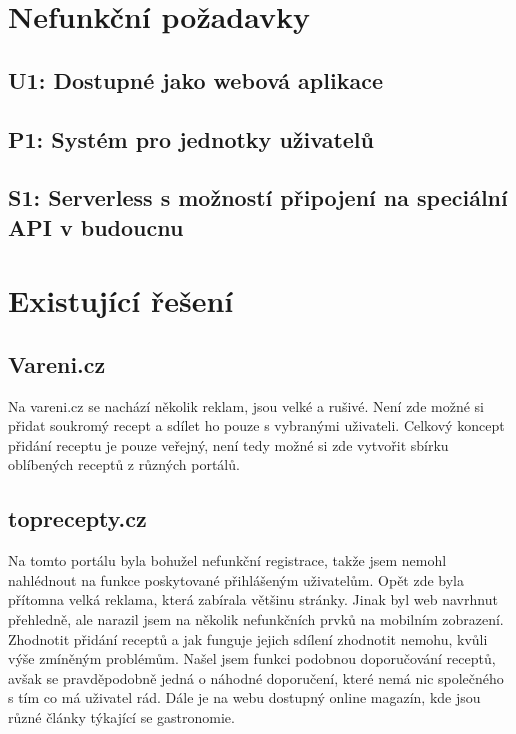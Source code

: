 \section{Nefunkční požadavky}

\subsection{U1: Dostupné jako webová aplikace}
\subsection{P1: Systém pro jednotky uživatelů}
\subsection{S1: Serverless s možností připojení na speciální API v budoucnu}

\section{Existující řešení}

\subsection{Vareni.cz}

Na vareni.cz se nachází několik reklam, jsou velké a rušivé. Není zde možné si přidat soukromý recept a sdílet ho
pouze s vybranými uživateli. Celkový koncept přidání receptu je pouze veřejný, není tedy možné si zde vytvořit sbírku
oblíbených receptů z různých portálů.

\subsection{toprecepty.cz}

Na tomto portálu byla bohužel nefunkční registrace, takže jsem nemohl nahlédnout na funkce poskytované přihlášeným
uživatelům. Opět zde byla přítomna velká reklama, která zabírala většinu stránky. Jinak byl web navrhnut přehledně,
ale narazil jsem na několik nefunkčních prvků na mobilním zobrazení. Zhodnotit přidání receptů a jak funguje jejich
sdílení zhodnotit nemohu, kvůli výše zmíněným problémům. Našel jsem funkci podobnou doporučování receptů, avšak se
pravděpodobně jedná o náhodné doporučení, které nemá nic společného s tím co má uživatel rád. Dále je na webu dostupný
online magazín, kde jsou různé články týkající se gastronomie.

